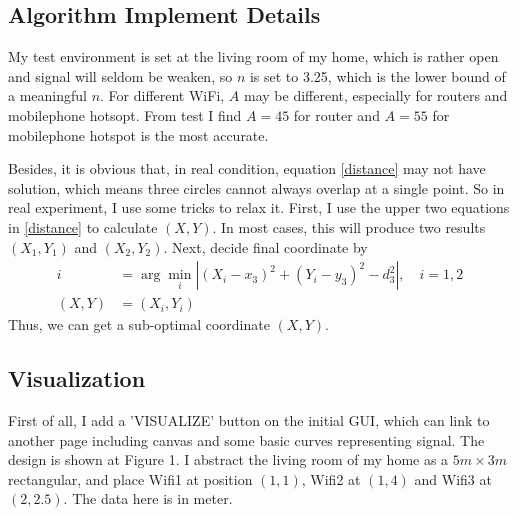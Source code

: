 \documentclass{article}
\begin{document}
\subsection{Algorithm Implement Details}
My test environment is set at the living room of my home, which is rather open and signal will seldom be weaken, so $n$ is set to 3.25, which is the lower bound of a meaningful $n$. For different WiFi, $A$ may be different, especially for routers and mobilephone hotsopt. From test I find $A=45$ for router and $A=55$ for mobilephone hotspot is the most accurate.

Besides, it is obvious that, in real condition, equation \ref{distance} may not have solution, which means three circles cannot always overlap at a single point. So in real experiment, I use some tricks to relax it. First, I use the upper two equations in \ref{distance} to calculate $(X,Y)$. In most cases, this will produce two results $(X_1,Y_1)$ and $(X_2,Y_2)$. Next, decide final coordinate by
\begin{equation}
\begin{aligned}
     i&=\arg\min_i|(X_i-x_3)^2+(Y_i-y_3)^2-d_3^2|, \quad i=1,2 \\
     (X,Y)&=(X_i,Y_i)
\end{aligned}
\end{equation}
Thus, we can get a sub-optimal coordinate $(X,Y)$.

\subsection{Visualization}
First of all, I add a 'VISUALIZE' button on the initial GUI, which can link to another page including canvas and some basic curves representing signal. The design is shown at Figure 1. I abstract the living room of my home as a $5m\times 3m$ rectangular, and place Wifi1 at position $(1,1)$, Wifi2 at $(1,4)$ and Wifi3 at $(2, 2.5)$. The data here is in meter.
\end{document}
